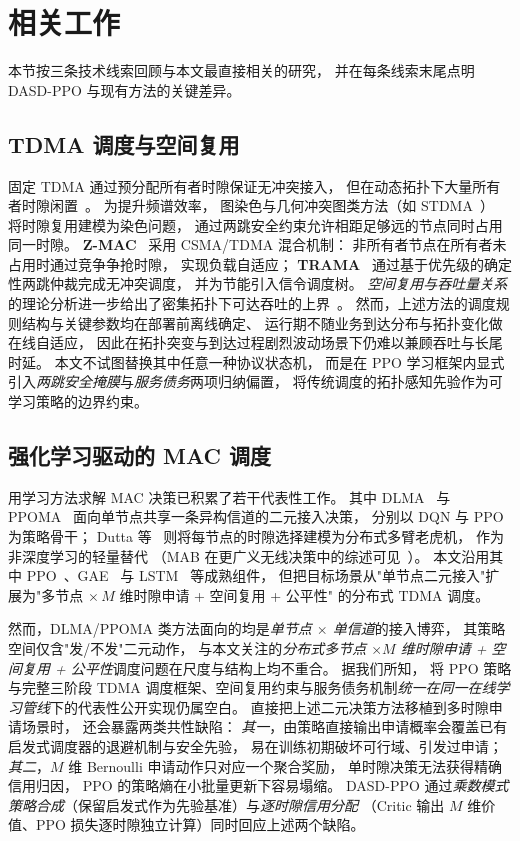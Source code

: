 \section{相关工作}
\label{sec:related}

本节按三条技术线索回顾与本文最直接相关的研究，
并在每条线索末尾点明 DASD-PPO 与现有方法的关键差异。

\subsection{TDMA 调度与空间复用}

固定 TDMA 通过预分配所有者时隙保证无冲突接入，
但在动态拓扑下大量所有者时隙闲置~\cite{author2024survey}。
为提升频谱效率，
图染色与几何冲突图类方法（如 STDMA~\cite{stdma}）
将时隙复用建模为染色问题，
通过两跳安全约束允许相距足够远的节点同时占用同一时隙。
\textbf{Z-MAC}~\cite{zmac} 采用 CSMA/TDMA 混合机制：
非所有者节点在所有者未占用时通过竞争争抢时隙，
实现负载自适应；
\textbf{TRAMA}~\cite{trama} 通过基于优先级的确定性两跳仲裁完成无冲突调度，
并为节能引入信令调度树。
\emph{空间复用与吞吐量关系}的理论分析进一步给出了密集拓扑下可达吞吐的上界~\cite{spatial_reuse}。
然而，上述方法的调度规则结构与关键参数均在部署前离线确定、
运行期不随业务到达分布与拓扑变化做在线自适应，
因此在拓扑突变与到达过程剧烈波动场景下仍难以兼顾吞吐与长尾时延。
本文不试图替换其中任意一种协议状态机，
而是在 PPO 学习框架内显式引入\emph{两跳安全掩膜}与\emph{服务债务}两项归纳偏置，
将传统调度的拓扑感知先验作为可学习策略的边界约束。

\subsection{强化学习驱动的 MAC 调度}

用学习方法求解 MAC 决策已积累了若干代表性工作。
其中 DLMA~\cite{drlmac2019} 与 PPOMA~\cite{ppoma2023} 面向单节点共享一条异构信道的二元接入决策，
分别以 DQN 与 PPO 为策略骨干；
Dutta 等~\cite{bandit} 则将每节点的时隙选择建模为分布式多臂老虎机，
作为非深度学习的轻量替代
（MAB 在更广义无线决策中的综述可见~\cite{mab_5g}）。
本文沿用其中 PPO~\cite{schulman2017ppo}、GAE~\cite{schulman2016gae} 与 LSTM~\cite{lSTM_seq} 等成熟组件，
但把目标场景从"单节点二元接入"扩展为"多节点 \(\times\,M\) 维时隙申请 + 空间复用 + 公平性"
的分布式 TDMA 调度。

然而，DLMA/PPOMA 类方法面向的均是\emph{单节点 \(\times\) 单信道}的接入博弈，
其策略空间仅含"发/不发"二元动作，
与本文关注的\emph{分布式多节点 \(\times M\) 维时隙申请 + 空间复用 + 公平性}调度问题在尺度与结构上均不重合。
据我们所知，
将 PPO 策略与完整三阶段 TDMA 调度框架、空间复用约束与服务债务机制\emph{统一在同一在线学习管线}下的代表性公开实现仍属空白。
直接把上述二元决策方法移植到多时隙申请场景时，
还会暴露两类共性缺陷：
\emph{其一}，由策略直接输出申请概率会覆盖已有启发式调度器的退避机制与安全先验，
易在训练初期破坏可行域、引发过申请；
\emph{其二}，\(M\) 维 Bernoulli 申请动作只对应一个聚合奖励，
单时隙决策无法获得精确信用归因，
PPO 的策略熵在小批量更新下容易塌缩。
DASD-PPO 通过\emph{乘数模式策略合成}（保留启发式作为先验基准）与\emph{逐时隙信用分配}
（Critic 输出 \(M\) 维价值、PPO 损失逐时隙独立计算）同时回应上述两个缺陷。

